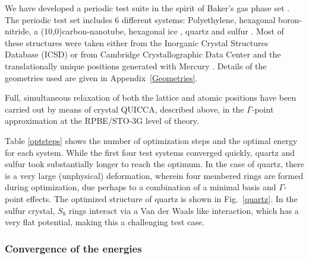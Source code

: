 \twolinestyle{\documentclass[prb,preprint]{revtex4}}
\begin{document}
We have developed a periodic test suite in the spirit of Baker's gas phase set \cite{JBaker93}.
The periodic test set includes 6 different systems: Polyethylene, hexagonal boron-nitride, 
a (10,0)carbon-nanotube, hexagonal ice \cite{AGoto90},  quartz \cite{MGTucker01} and sulfur \cite{ACGallacher92}. 
Most of these structures were taken either from the Inorganic Crystal Structures Database
(ICSD) \cite{ICSD} or from Cambridge Crystallographic Data Center
\cite{CCDC} and the translationally unique positions generated with Mercury \cite{Mercury}.  
Details of the geometries used are given in Appendix~\ref{Geometries}.  

Full, simultaneous relaxation of both the lattice and atomic positions have been carried out by means of 
crystal QUICCA, described above, in the $\Gamma$-point approximation at the RPBE/STO-3G level of theory. 

Table \ref{optsteps} shows the number of optimization steps and
the optimal energy for each system. While the first four test systems converged quickly,
quartz and sulfur took substantially longer to reach the optimum.
In the case of quartz, there is a very large (unphysical) deformation, wherein
four membered rings are formed during optimization, due perhaps to a combination of a minimal
basis and $\Gamma$-point effects.  The optimized structure of quartz is shown in Fig.~\ref{quartz}.
In the sulfur crystal, $S_{8}$ rings interact via a Van der Waals like interaction, which has a 
very flat potential, making this a challenging test case. 


\subsubsection{Convergence of the energies}
\end{document}
